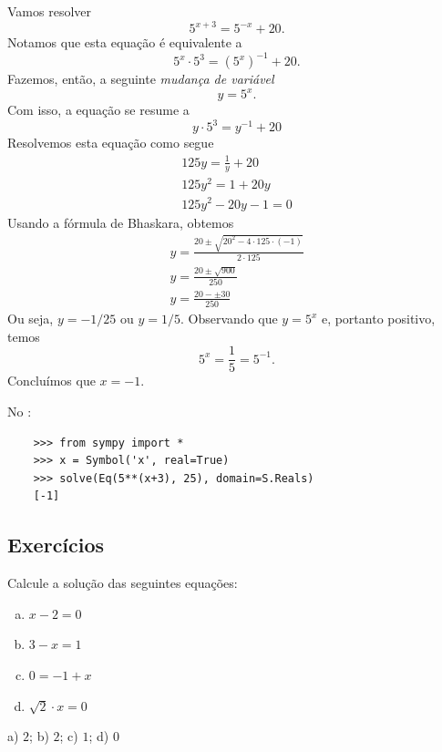 \begin{ex}
  Vamos resolver
  \begin{equation}
    5^{x+3} = 5^{-x} + 20.
  \end{equation}
  Notamos que esta equação é equivalente a
  \begin{equation}
    5^x\cdot 5^3 = \left(5^x\right)^{-1} + 20.
  \end{equation}
  Fazemos, então, a seguinte \emph{mudança de variável}
  \begin{equation}
    y = 5^x.
  \end{equation}
  Com isso, a equação se resume a
  \begin{equation}
    y\cdot 5^3 = y^{-1} + 20
  \end{equation}
  Resolvemos esta equação como segue
  \begin{gather}
    125y = \frac{1}{y} + 20 \\
    125y^2 = 1 + 20y \\
    125y^2 - 20y - 1 = 0
  \end{gather}
  Usando a fórmula de Bhaskara, obtemos
  \begin{gather}
    y = \frac{20 \pm \sqrt{20^2 - 4\cdot 125\cdot (-1)}}{2\cdot 125}\\
    y = \frac{20 \pm \sqrt{900}}{250} \\
    y = \frac{20 - \pm 30}{250}
  \end{gather}
  Ou seja, $y = -1/25$ ou $y = 1/5$. Observando que $y=5^x$ e, portanto positivo, temos
  \begin{equation}
    5^x = \frac{1}{5} = 5^{-1}.
  \end{equation}
  Concluímos que $x = -1$.

  \ifispython
  No \python:
  \begin{lstlisting}
    >>> from sympy import *
    >>> x = Symbol('x', real=True)
    >>> solve(Eq(5**(x+3), 25), domain=S.Reals)
    [-1]
  \end{lstlisting}
  \fi  
\end{ex}

\subsection*{Exercícios}

\begin{exer}
  Calcule a solução das seguintes equações:
  \begin{enumerate}[a)]
  \item $x - 2 = 0$
  \item $3 - x = 1$
  \item $0 = -1 + x$
  \item $\sqrt{2}\cdot x = 0$
  \end{enumerate}
\end{exer}
\begin{resp}
  a) $2$; b) $2$; c) $1$; d) $0$
\end{resp}

